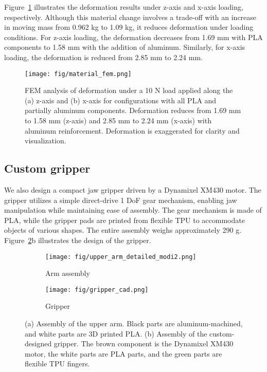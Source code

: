 Figure~\ref{fig:analysis} illustrates the deformation results under z-axis and x-axis loading, respectively. Although this material change involves a trade-off with an increase in moving mass from 0.962 kg to 1.09 kg, it reduces deformation under loading conditions. For z-axis loading, the deformation decreases from 1.69 mm with PLA components to 1.58 mm with the addition of aluminum. Similarly, for x-axis loading, the deformation is reduced from 2.85 mm to 2.24 mm.

\begin{figure}[hbt]
    \centering
    \texttt{[image: fig/material\_fem.png]}
    \caption{FEM analysis of deformation under a 10 N load applied along the (a) z-axis and (b) x-axis for configurations with all PLA and partially aluminum components. Deformation reduces from 1.69 mm to 1.58 mm (z-axis) and 2.85 mm to 2.24 mm (x-axis) with aluminum reinforcement. Deformation is exaggerated for clarity and visualization.}
    \label{fig:analysis}
\end{figure}

\subsection{Custom gripper}
We also design a compact jaw gripper driven by a Dynamixel XM430 motor. The gripper utilizes a simple direct-drive 1 DoF gear mechanism, enabling jaw manipulation while maintaining ease of assembly. The gear mechanism is made of PLA, while the gripper pads are printed from flexible TPU to accommodate objects of various shapes. The entire assembly weighs approximately 290 g. Figure~\ref{fig:arm_assembly_and_gripper}b illustrates the design of the gripper.

\begin{figure}
    \begin{subfigure}[t]{\linewidth}
        \centering
        \texttt{[image: fig/upper\_arm\_detailed\_modi2.png]}
        \caption{Arm assembly}
    \end{subfigure}
    \begin{subfigure}[t]{\linewidth}
        \centering
        \texttt{[image: fig/gripper\_cad.png]}
        \caption{Gripper}
    \end{subfigure}
    \caption{(a) Assembly of the upper arm. Black parts are aluminum-machined, and white parts are 3D printed PLA. (b) Assembly of the custom-designed gripper. The brown component is the Dynamixel XM430 motor, the white parts are PLA parts, and the green parts are flexible TPU fingers.}
    \label{fig:arm_assembly_and_gripper}
\end{figure}

